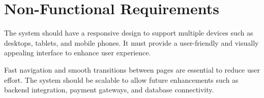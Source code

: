 \section{Non-Functional Requirements}

The system should have a responsive design to support multiple devices such as desktops, tablets, and mobile phones. It must provide a user-friendly and visually appealing interface to enhance user experience. 

Fast navigation and smooth transitions between pages are essential to reduce user effort. The system should be scalable to allow future enhancements such as backend integration, payment gateways, and database connectivity.